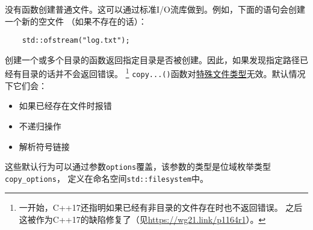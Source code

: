 没有函数创建普通文件。这可以通过标准I/O流库做到。例如，下面的语句会创建一个新的空文件
（如果不存在的话）：
\begin{lstlisting}
    std::ofstream("log.txt");
\end{lstlisting}
创建一个或多个目录的函数返回指定目录是否被创建。因此，如果发现指定路径已经有目录的话并不会返回错误。
\footnote{一开始，C++17还指明如果已经有非目录的文件存在时也不返回错误。
之后这被作为C++17的缺陷修复了（见\url{https://wg21.link/p1164r1}）。}
\texttt{copy...()}函数对\hyperref[文件类型]{特殊文件类型}无效。默认情况下它们会：
\begin{itemize}
    \item 如果已经存在文件时报错
    \item 不递归操作
    \item 解析符号链接
\end{itemize}
这些默认行为可以通过参数\texttt{options}覆盖，该参数的类型是位域枚举类型\texttt{copy\_options}，
定义在命名空间\texttt{std::filesystem}中。


